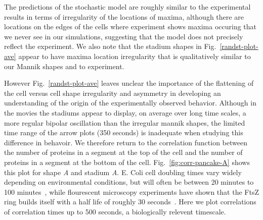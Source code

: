 \documentclass{pnastwo}
\newcommand{\red}[1]{{\bf \color{red} #1}}
\newcommand{\fixme}[1]{\red{[#1]}}
\begin{document}
\begin{article}

The predictions of the stochastic model are roughly similar to the
experimental results in terms of irregularity of the locations of
maxima, although there are locations on the edges of the cells where
experiment shows maxima occuring that we never see in our simulations,
suggesting that the model does not precisely reflect the experiment.
We also note that the stadium shapes in Fig.~\ref{randst-plot-ave}
appear to have maxima location irregularity that is qualitatively
similar to our Mannik shapes and to experiment.

However Fig.~\ref{randst-plot-ave} leaves unclear the importance of
the flattening of the cell versus cell shape irregularity and
asymmetry in developing an understanding of the origin of the
experimentally observed behavior.  Although in the movies the stadiums
appear to display, on average over long time scales, a more regular
bipolar oscillation than the irregular mannik shapes, the limited time
range of the arrow plots (350 seconds) is inadequate when studying
this difference in behavoir.  We therefore return to the correlation
function between the number of proteins in a segment at the top of the
cell and the number of proteins in a segment at the bottom of the
cell.  Fig.~\ref{fig:corr-pancake-A} shows this plot for shape
\emph{A} and stadium \emph{A}.  E. Coli cell doubling times vary
widely depending on environmental conditions, but will often be
between 20 minutes to 100 minutes~\cite{pierucci1972chromosome}, while
flourescent microscopy experiments have shown that the FtsZ ring
builds itself with a half life of roughly 30
seconds~\cite{stricker2002rapid}.  Here we plot correlations of
correlation times up to 500 seconds, a biologically relevent
timescale.


\end{article}
\end{document}
